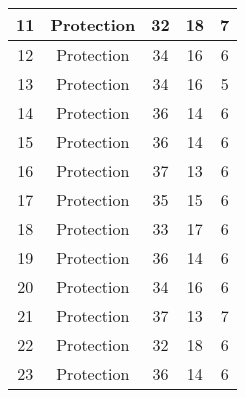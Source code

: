 \documentclass[results.tex]{subfiles}
\begin{document}
\begin{center}
\begin{tabular}{| c || c | c | c | c |}
            \hline
            11                      & Protection                   & 32                     & 18                      & 7                    \\
            \hline
            12                      & Protection                   & 34                     & 16                      & 6                    \\
            \hline
            13                      & Protection                   & 34                     & 16                      & 5                    \\
            \hline
            14                      & Protection                   & 36                     & 14                      & 6                    \\
            \hline
            15                      & Protection                   & 36                     & 14                      & 6                    \\
            \hline
            16                      & Protection                   & 37                     & 13                      & 6                    \\
            \hline
            17                      & Protection                   & 35                     & 15                      & 6                    \\
            \hline
            18                      & Protection                   & 33                     & 17                      & 6                    \\
            \hline
            19                      & Protection                   & 36                     & 14                      & 6                    \\
            \hline
            20                      & Protection                   & 34                     & 16                      & 6                    \\
            \hline
            21                      & Protection                   & 37                     & 13                      & 7                    \\
            \hline
            22                      & Protection                   & 32                     & 18                      & 6                    \\
            \hline
            23                      & Protection                   & 36                     & 14                      & 6                    \\

\end{tabular}
\end{center}
\end{document}
